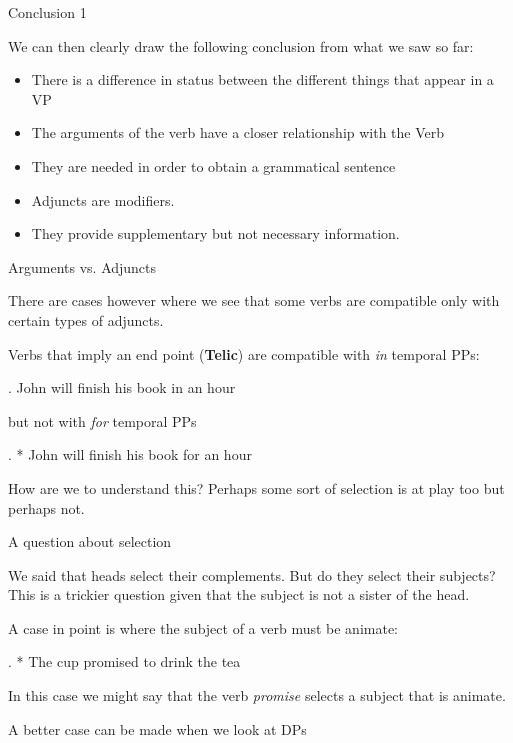 \begin{frame}
  {Conclusion 1}

We can then clearly draw the following conclusion from what we saw so far:

\begin{itemize}
\item There is a difference in status between the different things that appear in a VP
\item The arguments of the verb have a closer relationship with the Verb
\item They are needed in order to obtain a grammatical sentence
\item Adjuncts are modifiers.
\item They provide supplementary but not necessary information.
\end{itemize}
\end{frame}

\begin{frame}
  {Arguments vs. Adjuncts}

There are cases however where we see that some verbs are compatible only with certain types of adjuncts.

Verbs that imply an end point (\textbf{Telic}) are compatible with \textit{in} temporal PPs:

\ex.
John will finish his book in an hour

but not with \textit{for} temporal PPs

\ex.
* John will finish his book for an hour 


How are we to understand this?  Perhaps some sort of selection is at play too but perhaps not.

\end{frame}


\begin{frame}
  {A question about selection}

We said that heads select their complements.  But do they select their subjects?  This is a trickier question given that the subject is not a sister of the head.

A case in point is where the subject of a verb must be animate:

\ex.
* The cup promised to drink the tea

In this case we might say that the verb \textit{promise} selects a subject that is animate.  


A better case can be made when we look at DPs



\end{frame}

